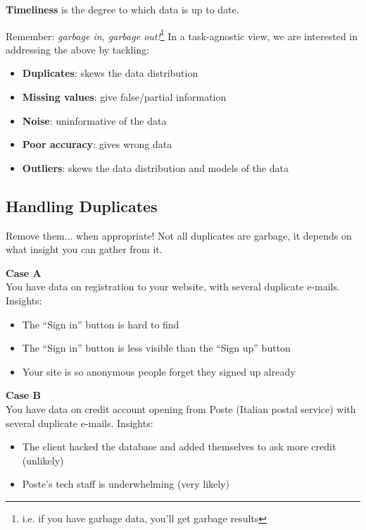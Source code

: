 \textbf{Timeliness} is the degree to which data is up to date.


Remember: \textit{garbage in, garbage out!}\footnote{i.e. if you have garbage data, you'll get garbage results} In a task-agnostic view, we are interested in addressing the above by tackling:
\begin{itemize}
	\item \textbf{Duplicates}: skews the data distribution
	\item \textbf{Missing values}: give false/partial information
	\item \textbf{Noise}: uninformative of the data
	\item \textbf{Poor accuracy}: gives wrong data
	\item \textbf{Outliers}: skews the data distribution and models of the data
\end{itemize}

\subsection{Handling Duplicates}
Remove them... when appropriate! Not all duplicates are garbage, it depends on what insight you can gather from it.
\begin{paracol}{2}
\textbf{Case A}\\
You have data on registration to your
website, with several duplicate e-mails.
Insights:
\begin{itemize}
	\item The ``Sign in'' button is hard to find
	\item The ``Sign in'' button is less visible
	      than the ``Sign up'' button
	\item Your site is so anonymous people
	      forget they signed up already
\end{itemize}
\switchcolumn
\textbf{Case B}\\
You have data on credit account opening
from Poste (Italian postal service) with
several duplicate e-mails.
Insights:
\begin{itemize}
	\item The client hacked the database and
	      added themselves to ask more
	      credit (unlikely)
	\item Poste's tech staff is underwhelming (very likely)
\end{itemize}
\end{paracol}

